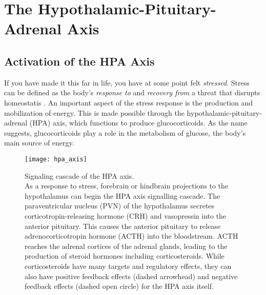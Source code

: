 \documentclass[12pt,twoside]{reedthesis}
\begin{document}
\section{The Hypothalamic-Pituitary-Adrenal Axis}

 \subsection{Activation of the HPA Axis}
If you have made it this far in life, you have at some point felt
\textit{stressed}. Stress can be
defined as the body's \textit{response to} and \textit{recovery from} a threat that disrupts
homeostatis \citep{van_bodegom_modulation_2017}. An important aspect of the stress response is the production and mobilization
 of energy. This is made possible through the hypothalamic-pituitary-adrenal (HPA)
 axis, which functions to produce glucocorticoids. As the name suggests,
 glucocorticoids play a role in the metabolism of glucose, the body's main
 source of energy.
\begin{figure}[htbp] 
\begin{centering} 
\texttt{[image: hpa\_axis]}
\caption[Signaling cascade of the HPA axis]{\footnotesize{Signaling cascade of the HPA axis.\\ As a response to
  stress, forebrain or hindbrain projections to the hypothalamus can begin the
  HPA axis signalling cascade. The paraventricular nucleus (PVN) of the
  hypothalamus secretes corticotropin-releasing hormone (CRH) and vasopressin
  into the anterior pituitary. This causes the anterior pituitary to release
  adrenocorticotropin hormone (ACTH) into the bloodstream. ACTH reaches the
  adrenal cortices of the adrenal glands, leading to the production of steroid
  hormones including corticosteroids. While corticosteroids have many targets
  and regulatory effects, they can also have positive feedback
effects (dashed arrowhead) and negative feedback effects (dashed open circle)
for the HPA axis itself.}}
\label{subd}
\end{centering} 
\end{figure}
\end{document}
